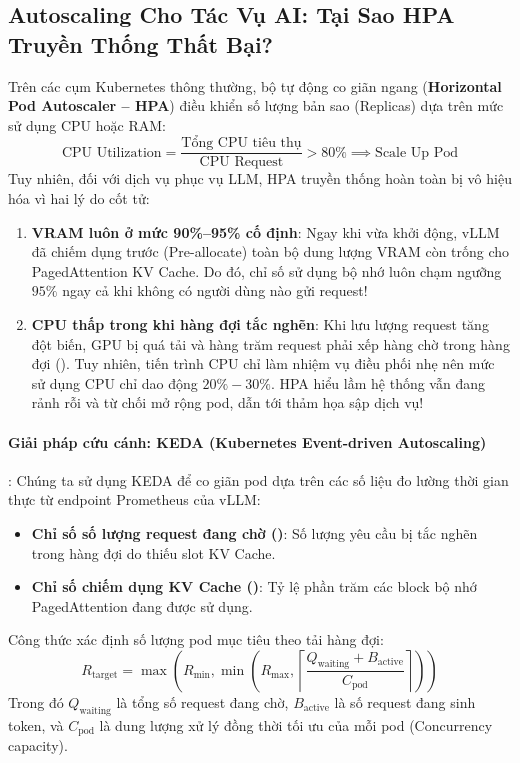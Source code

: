 \subsection{Autoscaling Cho Tác Vụ AI: Tại Sao HPA Truyền Thống Thất Bại?}
Trên các cụm Kubernetes thông thường, bộ tự động co giãn ngang (\textbf{Horizontal Pod Autoscaler -- HPA}) điều khiển số lượng bản sao (Replicas) dựa trên mức sử dụng CPU hoặc RAM:
\begin{equation}
\text{CPU Utilization} = \frac{\text{Tổng CPU tiêu thụ}}{\text{CPU Request}} > 80\% \implies \text{Scale Up Pod}
\end{equation}
Tuy nhiên, đối với dịch vụ phục vụ LLM, HPA truyền thống hoàn toàn bị vô hiệu hóa vì hai lý do cốt tử:
\begin{enumerate}
  \item \textbf{VRAM luôn ở mức 90\%--95\% cố định}: Ngay khi vừa khởi động, vLLM đã chiếm dụng trước (Pre-allocate) toàn bộ dung lượng VRAM còn trống cho PagedAttention KV Cache. Do đó, chỉ số sử dụng bộ nhớ luôn chạm ngưỡng $95\%$ ngay cả khi không có người dùng nào gửi request!
  \item \textbf{CPU thấp trong khi hàng đợi tắc nghẽn}: Khi lưu lượng request tăng đột biến, GPU bị quá tải và hàng trăm request phải xếp hàng chờ trong hàng đợi (). Tuy nhiên, tiến trình CPU chỉ làm nhiệm vụ điều phối nhẹ nên mức sử dụng CPU chỉ dao động $20\% - 30\%$. HPA hiểu lầm hệ thống vẫn đang rảnh rỗi và từ chối mở rộng pod, dẫn tới thảm họa sập dịch vụ!
\end{enumerate}

\paragraph{Giải pháp cứu cánh: KEDA (Kubernetes Event-driven Autoscaling)}:
Chúng ta sử dụng KEDA để co giãn pod dựa trên các số liệu đo lường thời gian thực từ endpoint Prometheus của vLLM:
\begin{itemize}
  \item \textbf{Chỉ số số lượng request đang chờ ()}: Số lượng yêu cầu bị tắc nghẽn trong hàng đợi do thiếu slot KV Cache.
  \item \textbf{Chỉ số chiếm dụng KV Cache ()}: Tỷ lệ phần trăm các block bộ nhớ PagedAttention đang được sử dụng.
\end{itemize}

Công thức xác định số lượng pod mục tiêu theo tải hàng đợi:
\begin{equation}
R_{\text{target}} = \max\left( R_{\min}, \min\left( R_{\max}, \left\lceil \frac{Q_{\text{waiting}} + B_{\text{active}}}{C_{\text{pod}}} \right\rceil \right) \right)
\end{equation}
Trong đó $Q_{\text{waiting}}$ là tổng số request đang chờ, $B_{\text{active}}$ là số request đang sinh token, và $C_{\text{pod}}$ là dung lượng xử lý đồng thời tối ưu của mỗi pod (Concurrency capacity).

